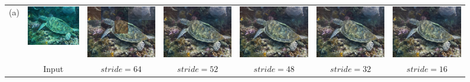 \begin{figure}[ht]
    \begin{center}
        \begin{tabular}{ccccccc}
            \multicolumn{1}{c}{(a)} & \hspace{-0.46cm}
            \includegraphics[width=0.15\linewidth]{figures/ch3/compare/discussion/input/im_f545_.jpg} & \hspace{-0.46cm}
            \includegraphics[width=0.15\linewidth]{figures/ch3/compare/discussion/diff_stride/stride64/im_f545_.png} & \hspace{-0.46cm}
            \includegraphics[width=0.15\linewidth]{figures/ch3/compare/discussion/diff_stride/stride52/im_f545_.png} & \hspace{-0.46cm}
            \includegraphics[width=0.15\linewidth]{figures/ch3/compare/discussion/diff_stride/stride48/im_f545_.png} & \hspace{-0.46cm}
            \includegraphics[width=0.15\linewidth]{figures/ch3/compare/discussion/diff_stride/stride32/im_f545_.png} & \hspace{-0.46cm}
            \includegraphics[width=0.15\linewidth]{figures/ch3/compare/discussion/diff_stride/stride16/im_f545_.png} \\
            \multicolumn{1}{c}{} & \small Input & \hspace{-0.36cm} \small $stride=64$ & \hspace{-0.36cm} \small $stride=52$ & \hspace{-0.36cm} \small $stride=48$ & \hspace{-0.36cm} \small $stride=32$ & \hspace{-0.36cm} \small $stride=16$ \\

\end{tabular}
\end{center}
\end{figure}
